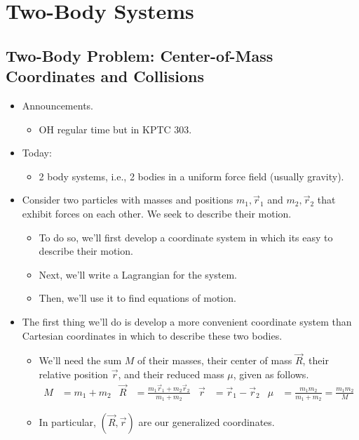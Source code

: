 \documentclass[../notes.tex]{subfiles}
\begin{document}
\chapter{Two-Body Systems}
\section{Two-Body Problem: Center-of-Mass Coordinates and Collisions}
\begin{itemize}
    \item {}Announcements.
    \begin{itemize}
        \item OH regular time but in KPTC 303.
    \end{itemize}
    \item Today:
    \begin{itemize}
        \item 2 body systems, i.e., 2 bodies in a uniform force field (usually gravity).
    \end{itemize}
    \item Consider two particles with masses and positions $m_1,\vec{r}_1$ and $m_2,\vec{r}_2$ that exhibit forces on each other. We seek to describe their motion.
    \begin{itemize}
        \item To do so, we'll first develop a coordinate system in which its easy to describe their motion.
        \item Next, we'll write a Lagrangian for the system.
        \item Then, we'll use it to find equations of motion.
    \end{itemize}
    \item The first thing we'll do is develop a more convenient coordinate system than Cartesian coordinates in which to describe these two bodies.
    \begin{itemize}
        \item We'll need the sum $M$ of their masses, their center of mass $\vec{R}$, their relative position $\vec{r}$, and their reduced mass $\mu$, given as follows.
        \begin{align*}
            M &= m_1+m_2&
            \vec{R} &= \frac{m_1\vec{r}_1+m_2\vec{r}_2}{m_1+m_2}&
            \vec{r} &= \vec{r}_1-\vec{r}_2&
            \mu &= \frac{m_1m_2}{m_1+m_2} = \frac{m_1m_2}{M}
        \end{align*}
        \item In particular, $(\vec{R},\vec{r})$ are our generalized coordinates.

\end{itemize}
\end{itemize}
\end{document}
